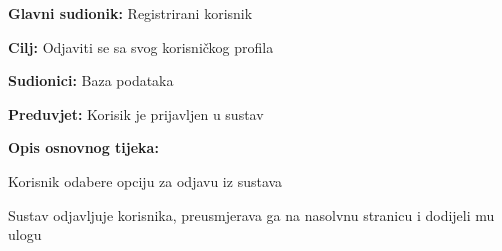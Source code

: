 			\noindent {}
		\begin{packed_item}
			
			\item \textbf{Glavni sudionik: }$ $Registrirani korisnik $ $
			\item  \textbf{Cilj:} $ $Odjaviti se sa svog korisničkog profila$ $
			\item  \textbf{Sudionici:} $ $Baza podataka$ $
			\item  \textbf{Preduvjet:} $ $Korisik je prijavljen u sustav$ $
			\item  \textbf{Opis osnovnog tijeka:}
			
			\item[] \begin{packed_enum}
				
				\item $ $Korisnik odabere opciju za odjavu iz sustava$ $
				\item $ $Sustav odjavljuje korisnika, preusmjerava ga na nasolvnu stranicu i dodijeli mu ulogu $ $
				
			\end{packed_enum}
		\end{packed_item}
		
